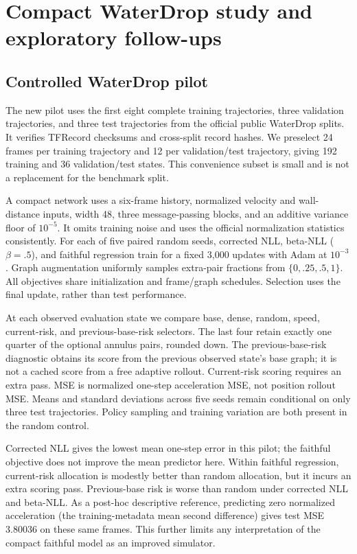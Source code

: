 

\section{Compact WaterDrop study and exploratory follow-ups}
\label{sec:compact-study}
\subsection{Controlled WaterDrop pilot}
The new pilot uses the first eight complete training trajectories, three validation trajectories, and three test trajectories from the official public WaterDrop splits. It verifies TFRecord checksums and cross-split record hashes. We preselect 24 frames per training trajectory and 12 per validation/test trajectory, giving 192 training and 36 validation/test states. This convenience subset is small and is not a replacement for the benchmark split.

A compact network uses a six-frame history, normalized velocity and wall-distance inputs, width 48, three message-passing blocks, and an additive variance floor of $10^{-5}$. It omits training noise and uses the official normalization statistics consistently. For each of five paired random seeds, corrected NLL, beta-NLL ($\beta=.5$), and faithful regression train for a fixed 3,000 updates with Adam at $10^{-3}$. Graph augmentation uniformly samples extra-pair fractions from $\{0,.25,.5,1\}$. All objectives share initialization and frame/graph schedules. Selection uses the final update, rather than test performance.

At each observed evaluation state we compare base, dense, random, speed, current-risk, and previous-base-risk selectors. The last four retain exactly one quarter of the optional annulus pairs, rounded down. The previous-base-risk diagnostic obtains its score from the previous observed state's base graph; it is not a cached score from a free adaptive rollout. Current-risk scoring requires an extra pass. MSE is normalized one-step acceleration MSE, not position rollout MSE. Means and standard deviations across five seeds remain conditional on only three test trajectories. Policy sampling and training variation are both present in the random control.


Corrected NLL gives the lowest mean one-step error in this pilot; the faithful objective does not improve the mean predictor here. Within faithful regression, current-risk allocation is modestly better than random allocation, but it incurs an extra scoring pass. Previous-base risk is worse than random under corrected NLL and beta-NLL. As a post-hoc descriptive reference, predicting zero normalized acceleration (the training-metadata mean second difference) gives test MSE 3.80036 on these same frames. This further limits any interpretation of the compact faithful model as an improved simulator.

